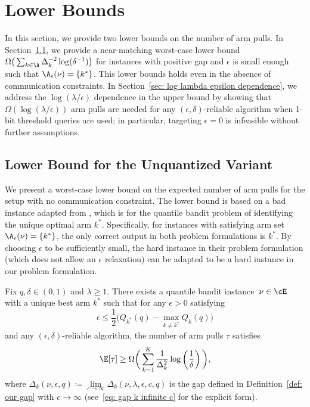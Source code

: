 \section{Lower Bounds}
\label{sec: lower bound}

In this section, we provide two lower bounds on the number of arm pulls.  In Section~\ref{sec: lower bound unquantized}, we provide a near-matching worst-case lower bound 
$\Omega \big( \sum_{k\in\A} \Delta_k^{-2} \log(\delta^{-1})  \big)$
for instances with positive gap and $\epsilon$ is small enough such that $\A_{\epsilon}(\nu)= \{k^*\}$.
This lower bounds holds even in the absence of communication constraints.
 In Section~\ref{sec: log lambda epsilon dependence}, we address the $\log(\lambda/\epsilon)$ dependence in the upper bound by showing that $\Omega(\log(\lambda/\epsilon))$ arm pulls are needed for any $(\epsilon, \delta)$-reliable algorithm when 1-bit threshold queries are used; in particular, targeting $\epsilon = 0$ is infeasible without further assumptions.
 




\subsection{Lower Bound for the Unquantized Variant}
\label{sec: lower bound unquantized}
We present a worst-case lower bound on the expected number of arm pulls for the setup with no communication constraint.
The lower bound is based on a bad instance adapted from \cite[Theorem 4]{nikolakakis2021quantile}, which is for the quantile bandit problem of identifying the unique optimal arm $k^*$.
Specifically, for instances with satisfying arm set $\A_{\epsilon}(\nu) = \{k^*\}$,
the only correct output in both problem formulations is $k^*$.
By choosing $\epsilon$ to be sufficiently small, the hard instance in their problem formulation (which does not allow an $\epsilon$ relaxation) can be adapted to be a hard instance in our problem formulation.



\begin{theorem}
\label{thm: lower bound unquantized}
Fix  $q, \delta \in (0, 1)$ and $\lambda \ge 1$.
There exists a quantile bandit instance~$\nu \in \cE$ with a unique best arm $k^*$ such that for any $\epsilon > 0$ satisfying
\begin{equation}
\label{eq: epsilon condition}
    \epsilon  \le
    \frac{1}{2} \big(Q_{k^*}(q) - \max \limits_{k \ne k^*} Q_k(q) \big)
\end{equation}
and any $(\epsilon, \delta)$-reliable algorithm,
 the number of arm pulls $\tau$ satisfies
\begin{equation}
\label{eq: lower bound unquantized}
\E[\tau]
\ge
\Omega \bigg(
\sum_{k=1}^K
 \frac{1}{\Delta_k^2}
    \log \left( \frac{1}{\delta} \right)
    \bigg),
\end{equation}
where $\Delta_{k}(\nu, \epsilon, q) \coloneqq \lim\limits_{c \to \infty} \Delta_{k}(\nu, \lambda, \epsilon, c, q)$ is the gap defined in Definition~\ref{def: our gap} with $c \to \infty$ (see~\eqref{eq: gap k infinite c} for the explicit form).
\end{theorem}

